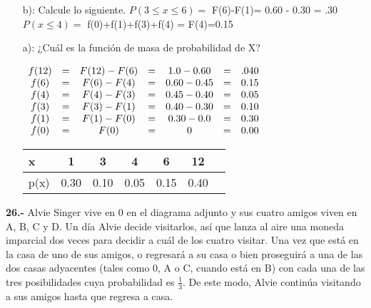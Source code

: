 \documentclass[12pt, letterpaper, spanish]{article}
\newcommand{\jump}{\vskip 0.01cm}
\begin{document}
\begin{itemize}
    \item[b):] Calcule lo siguiente.
    \jump $P(3\leq x \leq 6) =$ F(6)-F(1)= 0.60 - 0.30 = .30
    \jump $P(x \leq 4) =$ f(0)+f(1)+f(3)+f(4) = F(4)=0.15
    \item[a):] ¿Cuál es la función de masa de probabilidad de X?
    \jump \begin{center} $\begin{array}{c c c c c c c}
        f(12)&=&F(12)-F(6)&=&1.0 - 0.60&=&.040\\
        f(6)&=&F(6)-F(4)&=&0.60 - 0.45&=&0.15\\
        f(4)&=&F(4)-F(3)&=&0.45 - 0.40&=&0.05\\
        f(3)&=&F(3)-F(1)&=&0.40 - 0.30&=&0.10\\
        f(1)&=&F(1)-F(0)&=&0.30 - 0.0&=&0.30\\
        f(0)&=&F(0)&=&0 &=&0.00\\
    \end{array}$  \jump
    \begin{tabular}{l|c c c c c c}
        x&1&3&4&6&12\\
        \hline
        p(x)&0.30&0.10&0.05&0.15&0.40\\
    \end{tabular}
\end{center}
\end{itemize}
\textbf{26.-} Alvie Singer vive en 0 en el diagrama adjunto y sus cuatro amigos viven en A, B, C y D. Un día Alvie decide visitarlos, así que lanza al aire una moneda imparcial dos veces para decidir a cuál de los cuatro visitar. Una vez que está en la casa de uno de sus amigos, o regresará a su casa o bien proseguirá a una de las dos casas adyacentes (tales como 0, A o C, cuando está en B) con cada una de las tres posibilidades cuya probabilidad es $\displaystyle\frac{1}{3}$. De este modo, Alvie continúa visitando a sus amigos hasta que regresa a casa.
\jump
\begin{center}
\end{center}    
\end{document}
